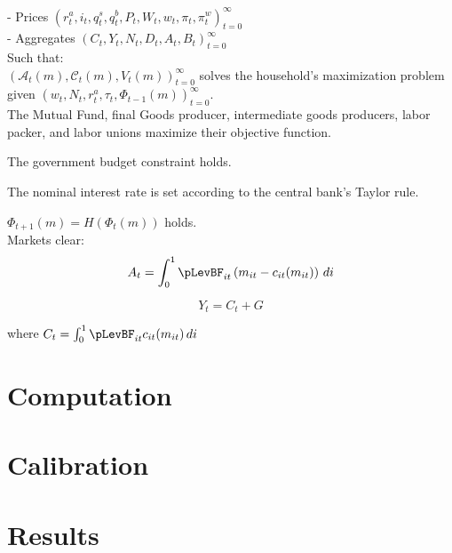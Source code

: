 \documentclass[titlepage]{\econtex}\providecommand{\texname}{BufferStockTheory}
\providecommand{\TableDir}{Tables}
\begin{document}
- Prices $ \left( r^{a}_{t}, i_{t}, q^{s}_{t}, q^{b}_{t}, P_{t}, W_{t} , w_{t} , \pi_{t}, \pi^{w}_{t} \right) _{t=0}^{\infty}$\\

- Aggregates $ \left(C_{t}, Y_{t} , N_{t},D_{t} , A_{t} , B_{t} \right)_{t=0}^{\infty}$\\

Such that: \\

$ \left( \mathcal{A}_{t}(m) , \mathcal{C}_{t}(m), V_{t}(m)\right)_{t=0}^{\infty}$  solves the household's maximization problem given $  \left( w_{t}, N_{t},  r^{a}_{t}, \tau_{t}, \Phi_{t-1}(m)\right)_{t=0}^{\infty}$.\\

The Mutual Fund, final Goods producer, intermediate goods producers, labor packer, and labor unions maximize their objective function.

The government budget constraint holds.

The nominal interest rate is set according to the central bank's Taylor rule.


$ \Phi_{t+1}(m) = H(\Phi_{t}(m))$ holds.\\


Markets clear:\\

 $$ A_t =  \int_{0}^{1} \pLevBF_{it}\left( m_{it} - c_{it}(m_{it})\right) \, di $$
 
 $$ Y_t = C_{t} +G $$
 
 where $C_{t} =  \int_{0}^{1} \pLevBF_{it} c_{it}(m_{it})\, di $


\hypertarget{Computation}{}
\section{Computation}

\hypertarget{Calibration}{}
\section{Calibration}








\hypertarget{Results}{}
\section{Results}


\hypertarget{Conclusion}{}
\end{document}
